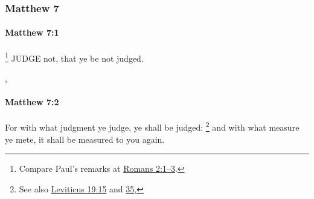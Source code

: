 	\subsubsection{Matthew 7} %
		\label{MATTHEW-7}
		
		\paragraph{Matthew 7:1} %
			\label{MATTHEW-7-1}

				\footnote{%
					Compare Paul's remarks at \hyperref[ROMANS-2-1]{Romans 2:1--3}.
					}%
			JUDGE not, that ye be not judged.

			\begin{framed}
			\scriptsize
				\begin{compactdesc}
					\item[SBLG]  \hyperref[KRINO]{},  \hyperref[KRINO]{}
				\end{compactdesc}
			\end{framed}

		\paragraph{Matthew 7:2} %
			\label{MATTHEW-7-2}

			For with what judgment ye judge, ye shall be judged:%
				\footnote{%
					See also \hyperref[LEVITICUS-19-15]{Leviticus 19:15} and \hyperref[LEVITICUS-19-35]{35},  
					}
			and with what measure ye mete, it shall be measured to you again.

